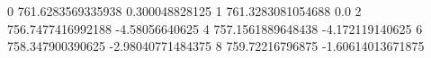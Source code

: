 0 761.6283569335938 0.300048828125
1 761.3283081054688 0.0
2 756.7477416992188 -4.58056640625
4 757.1561889648438 -4.172119140625
6 758.347900390625 -2.98040771484375
8 759.72216796875 -1.60614013671875
